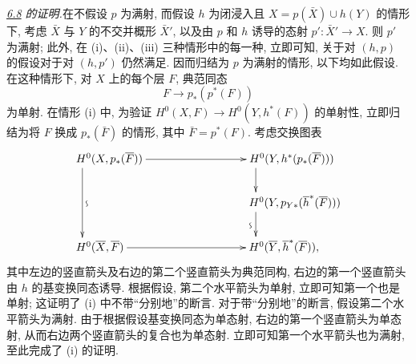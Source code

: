 \noindent
\emph{\hyperref[XII.prop6.8]{6.8} 的证明.}\pageoriginale 在不假设 $p$ 为满射, 而假设 $h$ 为闭浸入且 $X=p(\bar{X})\cup h(Y)$ 的情形下, 考虑 $\bar{X}$ 与 $Y$ 的不交并概形 $\bar{X}'$, 以及由 $p$ 和 $h$ 诱导的态射 $p':\bar{X}'\rightarrow X$. 则 $p'$ 为满射; 此外, 在 (i)、(ii)、(iii) 三种情形中的每一种, 立即可知, 关于对 $(h,p)$ 的假设对于对 $(h,p')$ 仍然满足. 因而归结为 $p$ 为满射的情形, 以下均如此假设. 在这种情形下, 对 $X$ 上的每个层 $F$, 典范同态
$$
F\longrightarrow p_{\ast}(p^{\ast}(F))
$$
为单射. 在情形 (i) 中, 为验证 $H^{0}(X,F)\rightarrow H^{0}(Y,h^{\ast}(F))$ 的单射性, 立即归结为将 $F$ 换成 $p_{\ast}(\bar{F})$ 的情形, 其中 $\bar{F}=p^{\ast}(F)$. 考虑交换图表
$$
\xymatrix@C=2.75cm@R=.75cm{
**[r]H^{0}(X,p_{\ast}(\bar{F})) \ar[dd]^{\text{\rotatebox{90}{$\backsim$}}} \ar[r]& **[r]H^{0}(Y,h^{\ast}(p_{\ast}(\bar{F}))) \ar[d]\\
                           &**[r]H^{0}(Y,p_{Y\ast}(\bar{h}^{\ast}(\bar{F})))\ar[d]_{\text{\rotatebox{90}{$\backsim$}}}\\
**[r]H^{0}(\bar{X},\bar{F})  \ar[r] &
                           **[r]H^{0}(\bar{Y},\bar{h}^{\ast}(\bar{F})),
}
$$
其中左边的竖直箭头及右边的第二个竖直箭头为典范同构, 右边的第一个竖直箭头由 $h$ 的基变换同态诱导. 根据假设, 第二个水平箭头为单射, 立即可知第一个也是单射; 这证明了 (i) 中不带“分别地”的断言. 对于带“分别地”的断言, 假设第二个水平箭头为满射. 由于根据假设基变换同态为单态射, 右边的第一个竖直箭头为单态射, 从而右边两个\pageoriginale 竖直箭头的复合也为单态射. 立即可知第一个水平箭头也为满射, 至此完成了 (i) 的证明.


